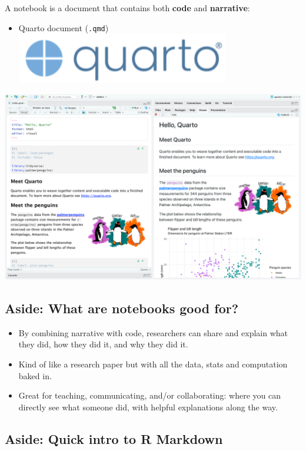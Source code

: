 \documentclass[
  letterpaper,
  DIV=11,
  numbers=noendperiod]{scrartcl}
\providecommand{\tightlist}{%
  \setlength{\itemsep}{0pt}\setlength{\parskip}{0pt}}\usepackage{longtable,booktabs,array}
\begin{document}
A notebook is a document that contains both \textbf{code} and
\textbf{narrative}:

\begin{itemize}
\tightlist
\item
  Quarto document (\texttt{.qmd})
  \includegraphics[width=3.64583in,height=\textheight]{img/quartologo.png}
\end{itemize}

\includegraphics{img/quartopenguins.png}

\subsection{Aside: What are notebooks good
for?}\label{aside-what-are-notebooks-good-for}

\begin{itemize}
\item
  By combining narrative with code, researchers can share and explain
  what they did, how they did it, and why they did it.
\item
  Kind of like a research paper but with all the data, stats and
  computation baked in.
\item
  Great for teaching, communicating, and/or collaborating: where you can
  directly see what someone did, with helpful explanations along the
  way.
\end{itemize}

\subsection{Aside: Quick intro to R
Markdown}\label{aside-quick-intro-to-r-markdown}
\end{document}
